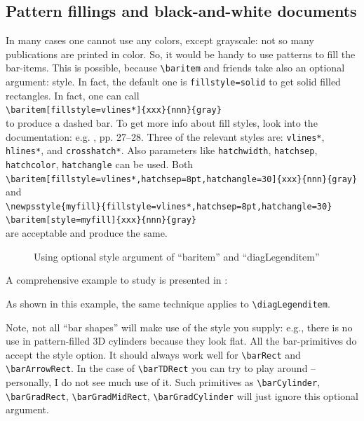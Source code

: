 \documentclass[12pt]{article}
\begin{document}
\subsection{Pattern fillings and black-and-white documents}
In many cases one cannot use any colors, except grayscale: not so many
publications are printed in color. So, it would be handy to use patterns 
to fill the bar-items. This is possible, because \verb+\baritem+
and friends take also an optional argument: style. In fact, the default one is
\verb+fillstyle=solid+ to get solid filled rectangles. In fact, one can call\\
\verb+\baritem[fillstyle=vlines*]{xxx}{nnn}{gray}+\\ 
to produce a dashed bar. To
get more info about fill styles, look into the  documentation:
e.g.  , pp. 27--28. 
Three of the relevant styles are: \verb+vlines*+, \verb+hlines*+, and
\verb+crosshatch*+. Also parameters like \verb+hatchwidth+, \verb+hatchsep+,
\verb+hatchcolor+, \verb+hatchangle+ can be used. Both\\
\verb+\baritem[fillstyle=vlines*,hatchsep=8pt,hatchangle=30]{xxx}{nnn}{gray}+\\
and\\
\verb+\newpsstyle{myfill}{fillstyle=vlines*,hatchsep=8pt,hatchangle=30}+\\
\verb+\baritem[style=myfill]{xxx}{nnn}{gray}+\\
are acceptable and produce the same.
\begin{figure}[t]\centering
  \renewcommand{\placenumber}{\bottom}
  \renewcommand\numbercolor{\black\bf}
  
\caption{\label{fig:cr} Using optional style argument of ``baritem'' and
                        ``diagLegenditem''}
\end{figure}
A comprehensive example to study is presented in :


As shown in this example, the same technique applies to \verb+\diagLegenditem+.

Note, not all ``bar shapes'' will make use of the style you supply: e.g.,
there is no use in pattern-filled 3D cylinders because they look flat.
All the bar-primitives do accept the style option. It should always work well
for \verb+\barRect+ and \verb+\barArrowRect+. In the case of \verb+\barTDRect+ 
you can try to play around
-- personally, I do not see much use of it. 
Such primitives as \verb+\barCylinder+,
\verb+\barGradRect+, \verb+\barGradMidRect+, \verb+\barGradCylinder+ will just
ignore this optional argument.
\end{document}
